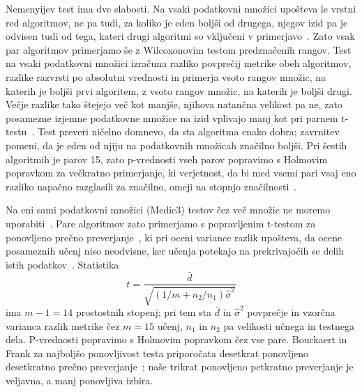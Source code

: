 \documentclass[a4paper,12pt,openright]{book}
\begin{document}
Nemenyijev test ima dve slabosti. Na vsaki podatkovni množici upošteva le
vrstni red algoritmov, ne pa tudi, za koliko je eden boljši od drugega, njegov
izid pa je odvisen tudi od tega, kateri drugi algoritmi so vključeni v
primerjavo~\cite{benavoli2016should}. Zato vsak par algoritmov primerjamo še z
Wilcoxonovim testom predznačenih rangov. Test na vsaki podatkovni množici
izračuna razliko povprečij metrike obeh algoritmov, razlike razvrsti po
absolutni vrednosti in primerja vsoto rangov množic, na katerih je boljši prvi
algoritem, z vsoto rangov množic, na katerih je boljši drugi. Večje razlike
tako štejejo več kot manjše, njihova natančna velikost pa ne, zato posamezne
izjemne podatkovne množice na izid vplivajo manj kot pri parnem
t-testu~\cite{demsar2006statistical}. Test preveri ničelno domnevo, da sta
algoritma enako dobra; zavrnitev pomeni, da je eden od njiju na podatkovnih
množicah značilno boljši. Pri šestih algoritmih je parov 15, zato p-vrednosti
vseh parov popravimo s Holmovim popravkom za večkratno primerjanje, ki
verjetnost, da bi med vsemi pari vsaj eno razliko napačno razglasili za
značilno, omeji na stopnjo značilnosti~\cite{demsar2006statistical}.

Na eni sami podatkovni množici (Medic3) testov čez več množic ne moremo
uporabiti~\cite{demsar2006statistical}. Pare algoritmov zato primerjamo s
popravljenim t-testom za ponovljeno prečno
preverjanje~\cite{bouckaert2004evaluating}, ki pri oceni variance razlik
upošteva, da ocene posameznih učenj niso neodvisne, ker učenja potekajo na
prekrivajočih se delih istih
podatkov~\cite{nadeau2003inference,bouckaert2004evaluating}.
Statistika
\[
t = \frac{\bar{d}}{\sqrt{\left(1/m + n_2/n_1\right)\hat{\sigma}^2}}
\]
ima $m - 1 = 14$ prostostnih stopenj; pri tem sta $\bar{d}$ in $\hat{\sigma}^2$
povprečje in vzorčna varianca razlik metrike čez $m = 15$ učenj, $n_1$ in $n_2$
pa velikosti učnega in testnega dela. P-vrednosti popravimo s Holmovim
popravkom čez vse pare. Bouckaert in Frank za najboljšo ponovljivost testa
priporočata desetkrat ponovljeno desetkratno prečno
preverjanje~\cite{bouckaert2004evaluating}; naše trikrat ponovljeno petkratno
preverjanje je veljavna, a manj ponovljiva izbira.
\end{document}
